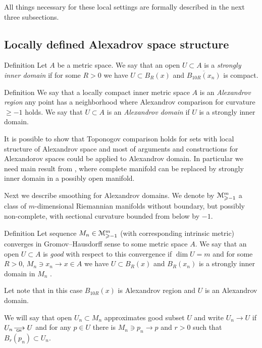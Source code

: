 \documentclass[a4paper,10pt]{article}
\begin{document}
 All things necessary for these local settings are 
 formally described in the next three subsections.


\subsection{Locally defined Alexadrov space structure }

\begin{rdef}{Definition}
Let $A$ be a metric space. 
We say that an open  $U\subset A$
is a \emph{strongly inner domain} if
for some 
$R>0$ we have
$U\subset B_R(x)$
and $\overline{B_{10R}(x_n)}$ is compact.

\end{rdef}

\begin{rdef}{Definition}
We say that
 a locally compact inner metric space $A$
is an \emph{ Alexandrov region}
any point has a neighborhood where Alexandrov
comparison for curvature $\ge -1$ holds.
We say that $U\subset A$
is an \emph{ Alexandrov domain}
 if $U$ is 
 a strongly inner domain.

\end{rdef}

It is possible to show  that 
Toponogov comparison holds for sets with local structure of Alexandrov space and most of arguments and constructions for Alexandorov spaces could be applied to Alexandrov domain.
In particular we need main result from
 \cite{petrunin-SC}, where complete manifold can be replaced by 
strongly inner domain in a possibly open manifold. 
 
 
 
 Next we describe smoothing for Alexandrov domains.
 We denote by
$\mathcal M_{\geqslant -1}^m$ a class of $m$-dimensional Riemannian 
manifolds without boundary, but possibly non-complete, with sectional curvature bounded
from below by $-1$.

\begin{rdef}{Definition}
Let sequence
$M_n\in\mathcal M_{\geqslant -1}^m$ (with corresponding intrinsic metric)
converges in Gromov--Hausdorff sense to some metric space $A$.
We say that an open $U\subset A$ is \emph{ good} with respect to this convergence
 if
$\dim U=m$ and for some 
$R>0$, $M_n\ni x_n\to x\in A$ we have
$U\subset B_R(x)$
and ${B_{R}(x_n)}$ is a strongly inner domain in
$ M_n$
. 
\end{rdef}
 Let note that in this case $B_{10R}(x)$ is Alexandrov region
 and $U$ is an Alexandrov domain.
 
 We will say that open $U_n\subset M_n$
approximates good subset $U$ and write $U_n\to U$
if $U_n\GHto U$ and for any $p\in U$ there is $M_n\ni p_n\to p$
and $r>0$ such that $B_r(p_n)\subset U_n$.
 
\end{document}
